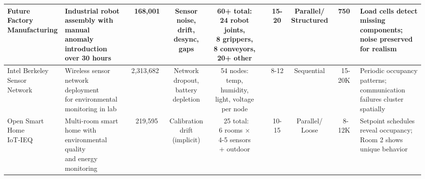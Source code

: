 \begin{table}[t]
{\begin{tabular}{@{}l|lcccc|cccl@{}}
\midrule
\makecell[l]{Future Factory\\Manufacturing} & \makecell[l]{Industrial robot\\assembly with manual\\anomaly introduction\\over 30 hours} & ~168,001 & \makecell[l]{Sensor noise,\\drift, desync,\\gaps} & \makecell[l]{60+ total:\\24 robot joints,\\8 grippers,\\8 conveyors,\\20+ other} & & 15-20 & \makecell{Parallel/\\Structured} & 750 & \makecell[l]{Load cells detect\\missing components;\\noise preserved\\for realism} \\
\midrule
\makecell[l]{Intel Berkeley\\Sensor\\Network} & \makecell[l]{Wireless sensor\\network deployment\\for environmental\\monitoring in lab} & 2,313,682 & \makecell[l]{Network\\dropout,\\battery\\depletion} & \makecell[l]{54 nodes:\\temp, humidity,\\light, voltage\\per node} & & 8-12 & Sequential & ~15-20K & \makecell[l]{Periodic occupancy\\patterns;\\communication\\failures cluster\\spatially} \\
\midrule
\makecell[l]{Open Smart\\Home\\IoT-IEQ} & \makecell[l]{Multi-room smart\\home with\\environmental quality\\and energy monitoring} & ~219,595 & \makecell[l]{Calibration\\drift\\(implicit)} & \makecell[l]{~25 total:\\6 rooms ×\\4-5 sensors\\+ outdoor} & & 10-15 & \makecell{Parallel/\\Loose} & ~8-12K & \makecell[l]{Setpoint schedules\\reveal occupancy;\\Room 2 shows\\unique behavior} \\

\end{tabular}}
\end{table}
